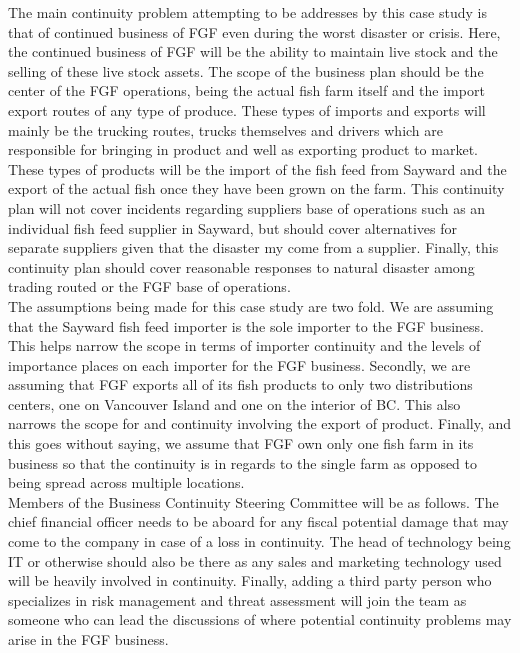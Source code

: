 \documentclass[paper=a4, fontsize=11pt]{scrartcl} %
\numberwithin{equation}{section} %
\numberwithin{figure}{section} %
\numberwithin{table}{section} %
\begin{document}
The main continuity problem attempting to be addresses by this case study is that of
continued business of FGF even during the worst disaster or crisis. Here, the continued
business of FGF will be the ability to maintain live stock and the selling of these live
stock assets. The scope of the business plan should be the center of the FGF operations,
being the actual fish farm itself and the import export routes of any type of produce.
These types of imports and exports will mainly be the trucking routes, trucks themselves
and drivers which are responsible for bringing in product and well as exporting product
to market. These types of products will be the import of the fish feed from Sayward and
the export of the actual fish once they have been grown on the farm. This continuity
plan will not cover incidents regarding suppliers base of operations such as an individual
fish feed supplier in Sayward, but should cover alternatives for separate suppliers
given that the disaster my come from a supplier. Finally, this continuity plan should
cover reasonable responses to natural disaster among trading routed or the FGF base of
operations.\\

The assumptions being made for this case study are two fold. We are assuming that the 
Sayward fish feed importer is the sole importer to the FGF business. This helps narrow
the scope in terms of importer continuity and the levels of importance places on each
importer for the FGF business. Secondly, we are assuming that FGF exports all of its
fish products to only two distributions centers, one on Vancouver Island and one
on the interior of BC. This also narrows the scope for and continuity involving the 
export of product. Finally, and this goes without saying, we assume that FGF own only
one fish farm in its business so that the continuity is in regards to the single farm
as opposed to being spread across multiple locations.\\

Members of the Business Continuity Steering Committee will be as follows. The chief
financial officer needs to be aboard for any fiscal potential damage that may come to
the company in case of a loss in continuity. The head of technology being IT or otherwise
should also be there as any sales and marketing technology used will be heavily involved
in continuity. Finally, adding a third party person who specializes in risk management
and threat assessment will join the team as someone who can lead the discussions of
where potential continuity problems may arise in the FGF business.\\
\end{document}
